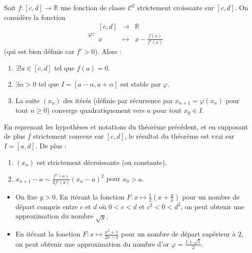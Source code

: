   \begin{theorem}
    Soit $f : [c, d] \rightarrow \mathbb{R}$ une fonction de classe $\mathcal{C}^2$ strictement croissante sur $[c, d]$. On considère la fonction
    \[ \varphi :
    \begin{array}{ccc}
      [c, d] &\rightarrow& \mathbb{R} \\
      x &\mapsto& x - \frac{f(x)}{f'(x)}
    \end{array}
    \]
    (qui est bien définie car $f' > 0$). Alors :
    \begin{enumerate}[label={\bfseries(\roman*)}]
      \item $\exists! a \in [c, d]$ tel que $f(a) = 0$.
      \item $\exists \alpha > 0$ tel que $I = [a - \alpha, a + \alpha]$ est stable par $\varphi$.
      \item La suite $(x_n)$ des itérés (définie par récurrence par $x_{n+1} = \varphi(x_n)$ pour tout $n \geq 0$) converge quadratiquement vers $a$ pour tout $x_0 \in I$.
    \end{enumerate}
  \end{theorem}

  \begin{corollary}
    En reprenant les hypothèses et notations du théorème précédent, et en supposant de plus $f$ strictement convexe sur $[c, d]$, le résultat du théorème est vrai sur $I = [a, d]$. De plus :
    \begin{enumerate}[label={\bfseries(\roman*)}]
      \item $(x_n)$ est strictement décroissante (ou constante).
      \item $x_{n+1} - a \sim \frac{f''(a)}{2f'(a)} (x_n - a)^2$ pour $x_0 > a$.
    \end{enumerate}
  \end{corollary}

  \begin{example}
    \begin{itemize}
      \item On fixe $y > 0$. En itérant la fonction $F : x \mapsto \frac{1}{2} \left( x + \frac{y}{x} \right)$ pour un nombre de départ compris entre $c$ et $d$ où $0 < c < d$ et $c^2 < 0 < d^2$, on peut obtenir une approximation du nombre $\sqrt{y}$.
      \item En itérant la fonction $F : x \mapsto \frac{x^2+1}{2x-1}$ pour un nombre de départ supérieur à $2$, on peut obtenir une approximation du nombre d'or $\varphi = \frac{1+\sqrt{5}}{2}$.
    \end{itemize}
  \end{example}

